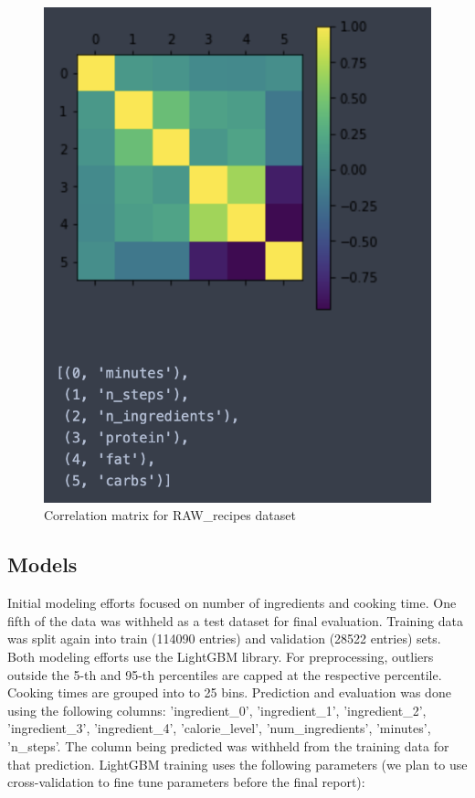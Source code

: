 \documentclass[sigconf]{acmart}
\begin{document}
\begin{figure}[h]
  \centering
  \includegraphics[width=\linewidth]{corrplot.png}
  \caption{Correlation matrix for RAW\_recipes dataset}
\end{figure}

\subsection{Models}
Initial modeling efforts focused on number of ingredients and cooking time. One fifth of the data was withheld as a test dataset for final evaluation. Training data was split again into train (114090 entries) and validation (28522 entries) sets. Both modeling efforts use the LightGBM library. For preprocessing, outliers outside the 5-th and 95-th percentiles are capped at the respective percentile. Cooking times are grouped into to 25 bins. Prediction and evaluation was done using the following columns: 'ingredient\_0', 'ingredient\_1', 'ingredient\_2', 'ingredient\_3', 'ingredient\_4', 'calorie\_level', 'num\_ingredients', 'minutes', 'n\_steps'. The column being predicted was withheld from the training data for that prediction. LightGBM training uses the following parameters (we plan to use cross-validation to fine tune parameters before the final report):  
\end{document}
